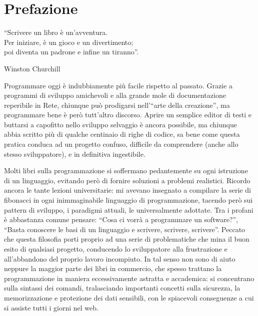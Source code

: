 
{}
\section*{Prefazione}
\label{cap:prefazione}

\epigraph{``Scrivere un libro è un'avventura.\\
Per iniziare, è un gioco e un divertimento; \\
poi diventa un padrone e infine un tiranno''.}%
{Winston Churchill}

Programmare oggi è indubbiamente più facile rispetto al passato. Grazie a programmi di sviluppo amichevoli e alla grande mole di documentazione reperibile in Rete, chiunque può prodigarsi nell'``arte della creazione'', ma programmare bene è però tutt'altro discorso. Aprire un semplice editor di testi e buttarsi a capofitto nello sviluppo selvaggio è ancora possibile, ma chiunque abbia scritto più di qualche centinaio di righe di codice, sa bene come questa pratica conduca ad un progetto confuso, difficile da comprendere (anche allo stesso sviluppatore), e in definitiva ingestibile.

Molti libri sulla programmazione si soffermano pedantemente su ogni istruzione di un linguaggio, evitando però di fornire soluzioni a problemi realistici. Ricordo ancora le tante lezioni universitarie: mi avevano insegnato a compilare la serie di fibonacci in ogni inimmaginabile linguaggio di programmazione, tacendo però sui pattern di sviluppo, i paradigmi attuali, le  universalmente adottate. Tra i profani è abbastanza comune pensare: ``Cosa ci vorrà a programmare un software?'', ``Basta conoscere le basi di un linguaggio e scrivere, scrivere, scrivere''. Peccato che questa filosofia porti proprio ad una serie di problematiche che mina il buon esito di qualsiasi progetto, conducendo lo sviluppatore alla frustrazione e all'abbandono del proprio lavoro incompiuto. In tal senso non sono di aiuto neppure la maggior parte dei libri in commercio, che spesso trattano la programmazione in maniera eccessivamente astratta e accademica: si concentrano sulla sintassi dei comandi, tralasciando importanti concetti sulla sicurezza, la memorizzazione e protezione dei dati sensibili, con le spiacevoli conseguenze a cui si assiste tutti i giorni nel web.

